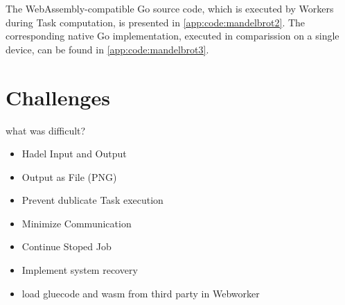 The WebAssembly-compatible Go source code, which is executed by Workers during Task computation, is presented in \ref{app:code:mandelbrot2}. The corresponding native Go implementation, executed in comparission on a single device, can be found in \ref{app:code:mandelbrot3}.

\section{Challenges}
\label{sec:implementation:challenges}
what was difficult?
\begin{itemize}
    \item Hadel Input and Output
    \item Output as File (PNG)
    \item Prevent dublicate Task execution
    \item Minimize Communication
    \item Continue Stoped Job
    \item Implement system recovery
    \item load gluecode and wasm from third party in Webworker
\end{itemize}